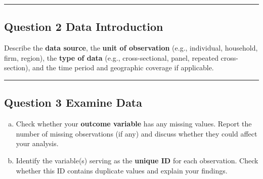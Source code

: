 \documentclass[paper=a4, fontsize=11pt]{scrartcl}
\newcommand{\horrule}[1]{\rule{\linewidth}{#1}}
\begin{document}
\bigskip\horrule{0.4pt}\bigskip


\subsection*{Question 2 \quad Data Introduction}

Describe the \textbf{data source}, the \textbf{unit of observation} (e.g., individual, household, firm, region), the \textbf{type of data} (e.g., cross-sectional, panel, repeated cross-section), and the time period and geographic coverage if applicable.


\bigskip\horrule{0.4pt}\bigskip


\subsection*{Question 3 \quad Examine Data}

\begin{enumerate}[(a)]
  \item Check whether your \textbf{outcome variable} has any missing values. Report the number of missing observations (if any) and discuss whether they could affect your analysis.
  \item Identify the variable(s) serving as the \textbf{unique ID} for each observation. Check whether this ID contains duplicate values and explain your findings.
\end{enumerate}
\end{document}
